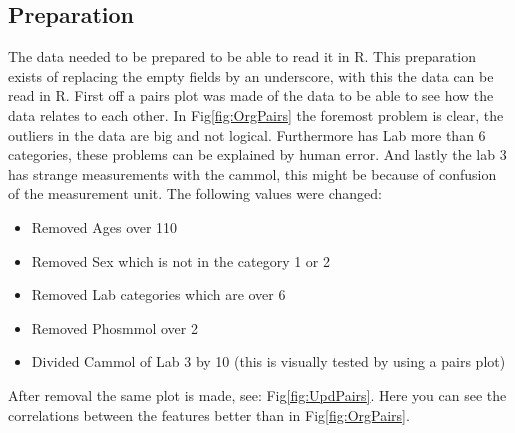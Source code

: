 \documentclass{article}
\begin{document}
    \subsection{Preparation}
      The data needed to be prepared to be able to read it in R.
      This preparation exists of replacing the empty fields by an underscore, with this the data can be read in R.
      First off a pairs plot was made of the data to be able to see how the data relates to each other.
      In Fig\ref{fig:OrgPairs} the foremost problem is clear, the outliers in the data are big and not logical.
      Furthermore has Lab more than 6 categories, these problems can be explained by human error.
      And lastly the lab 3 has strange measurements with the cammol, this might be because of confusion of the measurement unit.
      The following values were changed:
      \begin{itemize}
        \item Removed Ages over 110
        \item Removed Sex which is not in the category 1 or 2
        \item Removed Lab categories which are over 6
        \item Removed Phosmmol over 2
        \item Divided Cammol of Lab 3 by 10 (this is visually tested by using a pairs plot)
      \end{itemize}
      After removal the same plot is made, see: Fig\ref{fig:UpdPairs}.
      Here you can see the correlations between the features better than in Fig\ref{fig:OrgPairs}.
\end{document}
